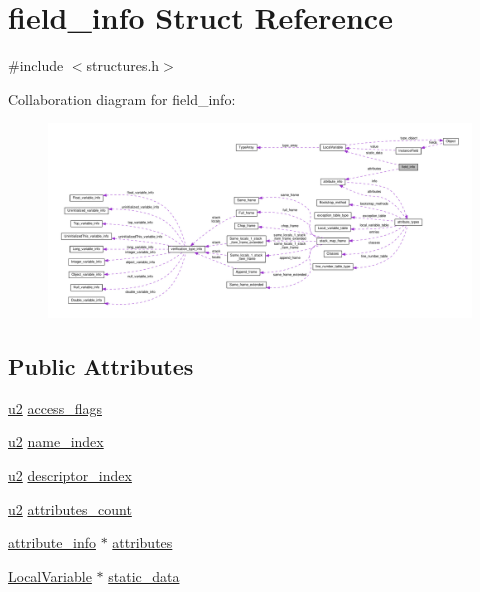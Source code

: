 \hypertarget{structfield__info}{}\section{field\+\_\+info Struct Reference}
\label{structfield__info}


{\ttfamily \#include $<$structures.\+h$>$}



Collaboration diagram for field\+\_\+info\+:
\nopagebreak
\begin{figure}[H]
\begin{center}
\leavevmode
\includegraphics[width=350pt]{structfield__info__coll__graph}
\end{center}
\end{figure}
\subsection*{Public Attributes}
\begin{DoxyCompactItemize}
\item 
\hyperlink{structures_8h_a55ef8d87fd202b8417704c089899c5b9}{u2} \hyperlink{structfield__info_aa622dc9a5b5353d2f3eb2f416dacab4b}{access\+\_\+flags}
\item 
\hyperlink{structures_8h_a55ef8d87fd202b8417704c089899c5b9}{u2} \hyperlink{structfield__info_a425e3ae85badd81c67ef00acca85ad9e}{name\+\_\+index}
\item 
\hyperlink{structures_8h_a55ef8d87fd202b8417704c089899c5b9}{u2} \hyperlink{structfield__info_a12dd492b7fb1d61da1ac14938d97b07f}{descriptor\+\_\+index}
\item 
\hyperlink{structures_8h_a55ef8d87fd202b8417704c089899c5b9}{u2} \hyperlink{structfield__info_a83bfa4ff84a608e3dbd1c3968ebe1b80}{attributes\+\_\+count}
\item 
\hyperlink{structattribute__info}{attribute\+\_\+info} $\ast$ \hyperlink{structfield__info_afdda114944ae5eaae78c237f99257108}{attributes}
\item 
\hyperlink{structLocalVariable}{Local\+Variable} $\ast$ \hyperlink{structfield__info_a90fc91c18e08fe2325cdeded20ee4578}{static\+\_\+data}
\end{DoxyCompactItemize}



